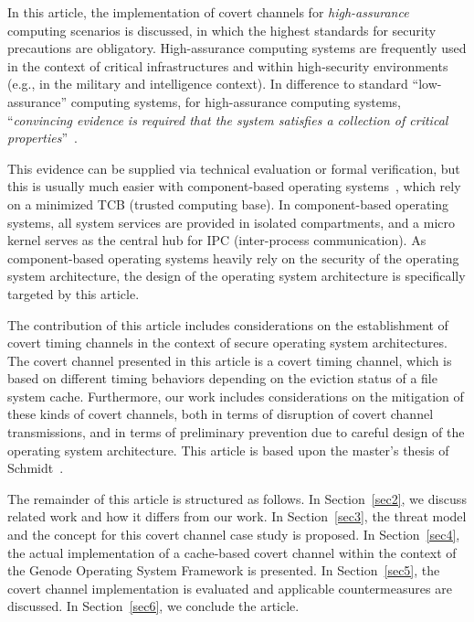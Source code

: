 \documentclass[runningheads,a4paper]{llncs}
\begin{document}
In this article, the implementation of covert channels for \emph{high-assurance} computing scenarios is discussed, in which the highest standards for security precautions are obligatory.
High-assurance computing systems are frequently used in the context of critical infrastructures and within high-security environments (e.g., in the military and intelligence context).
In difference to standard ``low-assurance'' computing systems, for high-assurance computing systems, ``\emph{convincing evidence is required that the system satisfies a collection of critical properties}''~\cite{Heimdahl98formalmethods}.

This evidence can be supplied via technical evaluation or formal verification, but this is usually much easier with component-based operating systems~\cite{jaeger:1998:sac:319195.319229}, which rely on a minimized TCB (trusted computing base).
In component-based operating systems, all system services are provided in isolated compartments, and a micro kernel serves as the central hub for IPC (inter-process communication).
As component-based operating systems heavily rely on the security of the operating system architecture, the design of the operating system architecture is specifically targeted by this article.

The contribution of this article includes considerations on the establishment of covert timing channels in the context of secure operating system architectures.
The covert channel presented in this article is a covert timing channel, which is based on different timing behaviors depending on the eviction status of a file system cache.
Furthermore, our work includes considerations on the mitigation of these kinds of covert channels, both in terms of disruption of covert channel transmissions, and in terms of preliminary prevention due to careful design of the operating system architecture.
This article is based upon the master's thesis of Schmidt~\cite{wschmidt}.

The remainder of this article is structured as follows.
In Section~\ref{sec2}, we discuss related work and how it differs from our work. 
In Section~\ref{sec3}, the threat model and the concept for this covert channel case study is proposed.
In Section~\ref{sec4}, the actual implementation of a cache-based covert channel within the context of the Genode Operating System Framework is presented.
In Section~\ref{sec5}, the covert channel implementation is evaluated and applicable countermeasures are discussed.
In Section~\ref{sec6}, we conclude the article.
\end{document}
